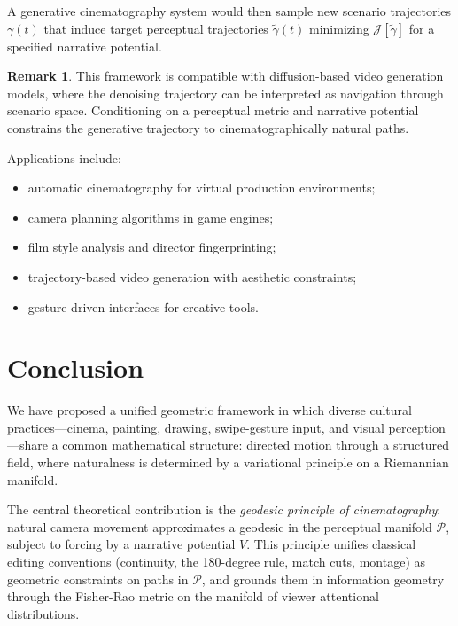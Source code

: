 \documentclass[12pt,a4paper]{article}
\theoremstyle{plain}
\theoremstyle{definition}
\newtheorem{remark}[theorem]{Remark}
\begin{document}
A generative cinematography system would then sample new scenario trajectories
$\gamma(t)$ that induce target perceptual trajectories $\tilde\gamma(t)$
minimizing $\mathcal{J}[\tilde\gamma]$ for a specified narrative potential.

\begin{remark}
This framework is compatible with diffusion-based video generation models, where
the denoising trajectory can be interpreted as navigation through scenario space.
Conditioning on a perceptual metric and narrative potential constrains the
generative trajectory to cinematographically natural paths.
\end{remark}

Applications include:
\begin{itemize}[nosep]
\item automatic cinematography for virtual production environments;
\item camera planning algorithms in game engines;
\item film style analysis and director fingerprinting;
\item trajectory-based video generation with aesthetic constraints;
\item gesture-driven interfaces for creative tools.
\end{itemize}

\section{Conclusion}
\label{sec:conclusion}

We have proposed a unified geometric framework in which diverse cultural
practices---cinema, painting, drawing, swipe-gesture input, and visual
perception---share a common mathematical structure: directed motion through a
structured field, where naturalness is determined by a variational principle on
a Riemannian manifold.

The central theoretical contribution is the \emph{geodesic principle of
cinematography}: natural camera movement approximates a geodesic in the
perceptual manifold $\mathcal{P}$, subject to forcing by a narrative potential
$V$. This principle unifies classical editing conventions (continuity, the
180-degree rule, match cuts, montage) as geometric constraints on paths in
$\mathcal{P}$, and grounds them in information geometry through the Fisher-Rao
metric on the manifold of viewer attentional distributions.
\end{document}
